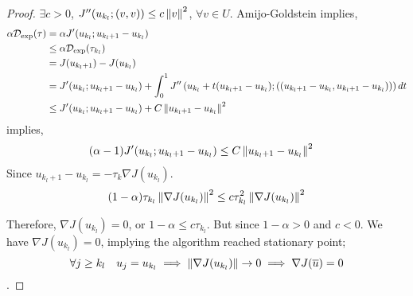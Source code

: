 \begin{theorem}
\begin{proof}
	$\exists c >0$, $J''(u_{k_l};(v,v))\leq c \left\lVert v\right\rVert^2$, $\forall v \in U$. 	Amijo-Goldstein implies,
	\begin{align*}
		\alpha \mathcal{D}_{\text{exp}} (\tau) &= \alpha J'(u_{k_l};u_{{k_l}+1}-u_{{k_l}})\\ &\leq \alpha \mathcal{D}_{\text{exp}}(\tau_{k_l})\\&= J(u_{k_l+1})-J(u_{k_l}) \\
		&= J'(u_{k_l};u_{k_l+1}-u_{k_l}) + \int_{0}^{1} J''\left(u_{k_l}+t(u_{k_l+1}-u_{k_l}); \left((u_{k_l+1}-u_{k_l}, u_{k_l+1}-u_{k_l})\right)\right) dt \\
		& \leq J'(u_{k_l};u_{k_l+1}-u_{k_l}) + C \left\lVert u_{k_l+1}-u_{k_l}\right\rVert^2
		\end{align*}
	implies,
	\begin{align*}
	(\alpha -1) J'(u_{k_l};u_{k_l+1}-u_{k_l}) &\leq C \left\lVert u_{k_l+1}-u_{k_l}\right\rVert^2 
	\end{align*}
	Since $u_{k_l+1}-u_{k_l}= -\tau_k \nabla J(u_{k_l})$.
	\begin{align*}
		(1-\alpha) \tau_{k_l} \left\lVert\nabla J(u_{k_l})\right\rVert^2 \leq c \tau_{k_l}^2\left\lVert\nabla J(u_{k_l})\right\rVert^2
	\end{align*}
	
	Therefore, $\nabla J(u_{k_l})=0$, or $ 1-\alpha \leq c \tau_{k_l}$. But since $1-\alpha > 0$ and $c <0$. 
	We have $\nabla J(u_{k_l}) =0$, implying the algorithm reached stationary point; 
		\[\forall j \geq k_l \quad u_j= u_{k_l}  \implies \left\lVert\nabla J(u_{k_l})\right\rVert \rightarrow 0 \implies \nabla J(\overline{u})=0\].
	\end{proof}
\end{theorem}
